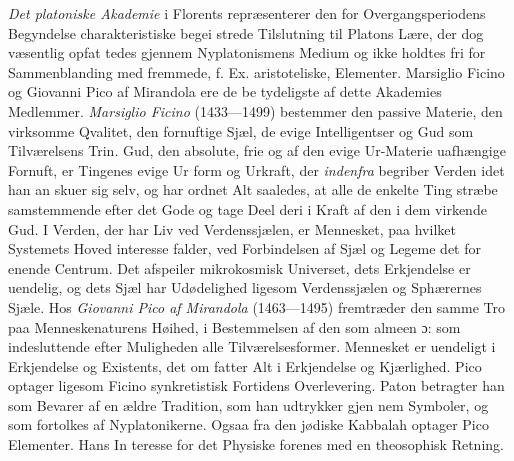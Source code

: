 \documentclass[12pt,a4paper]{book}
\begin{document}
\emph{Det platoniske Akademie} i Florents repræsenterer
den for Overgangsperiodens Begyndelse charakteristiske begei\-%
strede Tilslutning til Platons Lære, der dog væsentlig opfat\-%
tedes gjennem Nyplatonismens Medium og ikke holdtes fri for
Sammenblanding med fremmede, f. Ex. aristoteliske, Elementer.
Marsiglio Ficino og Giovanni Pico af Mirandola ere de be\-%
tydeligste af dette Akademies Medlemmer. \emph{Marsiglio Ficino}
(1433---1499) bestemmer den passive Materie, den virksomme
Qvalitet, den fornuftige Sjæl, de evige Intelligentser og Gud
som Tilværelsens Trin. Gud, den absolute, frie og af den
evige Ur-Materie uafhængige Fornuft, er Tingenes evige Ur\-%
form og Urkraft, der \emph{indenfra} begriber Verden idet han an\-%
skuer sig selv, og har ordnet Alt saaledes, at alle de enkelte
Ting stræbe samstemmende efter det Gode og tage Deel deri
i Kraft af den i dem virkende Gud. I Verden, der har Liv
ved Verdenssjælen, er Mennesket, paa hvilket Systemets Hoved\-%
interesse falder, ved Forbindelsen af Sjæl og Legeme det for\-%
enende Centrum. Det afspeiler mikrokosmisk Universet, dets
Erkjendelse er uendelig, og dets Sjæl har Udødelighed ligesom
Verdenssjælen og Sphærernes Sjæle. Hos \emph{Giovanni Pico af
Mirandola} (1463---1495) fremtræder den samme Tro paa
Menneskenaturens Høihed, i Bestemmelsen af den som almeen
ɔ: som indesluttende efter Muligheden alle Tilværelsesformer.
Mennesket er uendeligt i Erkjendelse og Existents, det om\-%
fatter Alt i Erkjendelse og Kjærlighed. Pico optager ligesom
Ficino synkretistisk Fortidens Overlevering. Paton betragter han
som Bevarer af en ældre Tradition, som han udtrykker gjen\-%
nem Symboler, og som fortolkes af Nyplatonikerne. Ogsaa
fra den jødiske Kabbalah optager Pico Elementer. Hans In\-%
teresse for det Physiske forenes med en theosophisk Retning.
\end{document}
